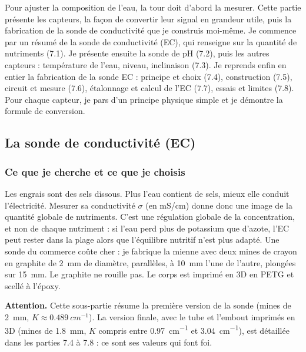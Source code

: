 \clearpage
{}

Pour ajuster la composition de l'eau, la tour doit d'abord la mesurer. Cette partie présente les capteurs, la façon de convertir leur signal en grandeur utile, puis la fabrication de la sonde de conductivité que je construis moi-même. Je commence par un résumé de la sonde de conductivité (EC), qui renseigne sur la quantité de nutriments (7.1). Je présente ensuite la sonde de pH (7.2), puis les autres capteurs : température de l'eau, niveau, inclinaison (7.3). Je reprends enfin en entier la fabrication de la sonde EC : principe et choix (7.4), construction (7.5), circuit et mesure (7.6), étalonnage et calcul de l'EC (7.7), essais et limites (7.8). Pour chaque capteur, je pars d'un principe physique simple et je démontre la formule de conversion.

\subsection{La sonde de conductivité (EC)}

\subsubsection*{Ce que je cherche et ce que je choisis}

Les engrais sont des sels dissous. Plus l'eau contient de sels, mieux elle conduit l'électricité. Mesurer sa conductivité $\sigma$ (en mS/cm) donne donc une image de la quantité globale de nutriments. C'est une régulation globale de la concentration, et non de chaque nutriment : si l'eau perd plus de potassium que d'azote, l'EC peut rester dans la plage alors que l'équilibre nutritif n'est plus adapté. Une sonde du commerce coûte cher : je fabrique la mienne avec deux mines de crayon en graphite de \qty{2}{mm} de diamètre, parallèles, à \qty{10}{mm} l'une de l'autre, plongées sur \qty{15}{mm}. Le graphite ne rouille pas. Le corps est imprimé en 3D en PETG et scellé à l'époxy.

\textbf{Attention.} Cette sous-partie résume la première version de la sonde (mines de \qty{2}{mm}, $K \approx \qty{0,489}{cm^{-1}}$). La version finale, avec le tube et l'embout imprimés en 3D (mines de \qty{1,8}{mm}, $K$ compris entre \qty{0,97}{cm^{-1}} et \qty{3,04}{cm^{-1}}), est détaillée dans les parties 7.4 à 7.8 : ce sont ses valeurs qui font foi.

